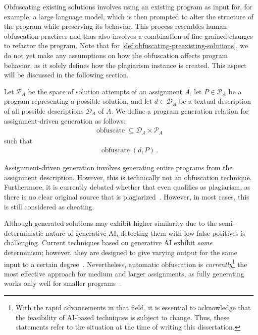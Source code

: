 Obfuscating existing solutions involves using an existing program as input for, for example, a large language model, which is then prompted to alter the structure of the program while preserving its behavior. This process resembles human obfuscation practices and thus also involves a combination of fine-grained changes to refactor the program.
%
Note that for \autoref{def:obfuscating-preexisting-solutions}, we do not yet make any assumptions on how the obfuscation affects program behavior, as it solely defines how the plagiarism instance is created. This aspect will be discussed in the following section.

\begin{theorem}
\label{def:assignment-driven-geenration}
Let  \(\mathcal{P}_A\) be the space of solution attempts of an assignment \(A\), let \(P \in \mathcal{P}_A\) be a program representing a possible solution, and let \(d \in \mathcal{D}_A\) be a textual description of all possible descriptions \(\mathcal{D}_A\) of \(A\).
We define a program generation relation for assignment-driven generation as follows:
\begin{align*}
    \operatorname{obfuscate} \subseteq \mathcal{D}_A \times \mathcal{P}_A
\end{align*}
such that
\begin{align*}
    \operatorname{obfuscate}(d, P)\,.
\end{align*}
\end{theorem}

Assignment-driven generation involves generating entire programs from the assignment description. However, this is technically not an obfuscation technique. Furthermore, it is currently debated whether that even qualifies as plagiarism, as there is no clear original source that is plagiarized~\cite{Novak2019}. However, in most cases, this is still considered as cheating.

Although generated solutions may exhibit higher similarity due to the semi-deterministic nature of generative AI, detecting them with low false positives is challenging. Current techniques based on generative AI exhibit \textit{some} determinism; however, they are designed to give varying output for the same input to a certain degree~\cite{Ouyang2023}.
Nevertheless, automatic obfuscation is \textit{currently}\footnote{With the rapid advancements in that field, it is essential to acknowledge that the feasibility of AI-based techniques is subject to change. Thus, these statements refer to the situation at the time of writing this dissertation.} the most effective approach for medium and larger assignments, as fully generating works only well for smaller programs~\cite{Saglam2024a, Saglam2024b}.

